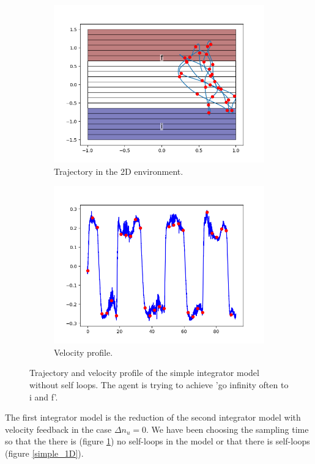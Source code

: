 \documentclass{article}
\theoremstyle{named}
\begin{document}
\begin{figure}[!ht]
	\begin{subfigure}[b]{0.5\textwidth}
  		\centering
  		\includegraphics[width=0.9\linewidth]{simplenosl_1D}
	  	\caption{Trajectory in the 2D environment.}
	  	\label{simplenosl_1D}
  \end{subfigure}
	\begin{subfigure}[b]{0.5\textwidth}
  		\centering
  		\includegraphics[width=0.9\linewidth]{simplenosl_1D_vel}
	  	\caption{Velocity profile.}
	  	\label{simplenosl_1D_vel}
  \end{subfigure}
  \caption{Trajectory and velocity profile of the simple integrator model without self loops. The agent is trying to achieve 'go infinity often to i and f'.}
\end{figure}

The first integrator model is the reduction of the second integrator model with velocity feedback in the case $\Delta n_u = 0$.
We have been choosing the sampling time so that the there is (figure \ref{simplenosl_1D}) no self-loops in the model or that there is self-loops (figure \ref{simple_1D}).
\end{document}
